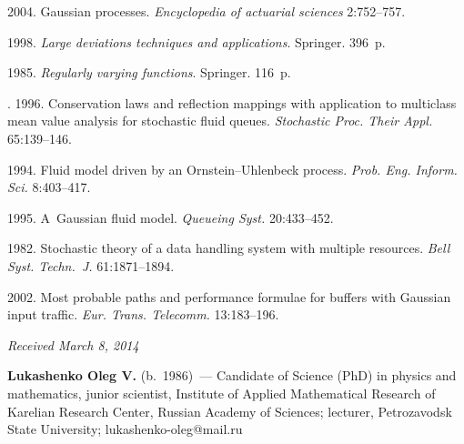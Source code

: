 \begin{multicols}{2}
{{\begin{thebibliography}{99}
 2004. Gaussian processes. \textit{Encyclopedia of actuarial
sciences} 2:752--757.

 1998.
\textit{Large deviations techniques and applications}. Springer. 396~p.

 1985. \textit{Regularly varying functions}. Springer. 116~p.

. 1996.
Conservation
laws and reflection mappings with application to multiclass mean
value analysis for stochastic fluid queues. \textit{Stochastic
Proc. Their Appl.} 65:139--146.

 1994.
Fluid model driven by an Ornstein--Uhlenbeck process.
\textit{Prob. Eng. Inform. Sci.} 8:403--417.

  1995.
A~Gaussian fluid model. \textit{Queueing Syst.} 20:433--452.

  1982.
Stochastic theory of a data handling system with multiple resources.
\textit{Bell Syst. Techn.~J.} 61:1871--1894.

 2002. Most probable paths and performance
formulae for buffers with Gaussian input traffic.
\textit{Eur. Trans. Telecomm.} 13:183--196.



\end{thebibliography} } }

\end{multicols}

\vspace*{-6pt}

\hfill{\small\textit{Received March 8, 2014}}

\vspace*{-6pt}

\Contr

\noindent
\textbf{Lukashenko Oleg V.} (b.\ 1986)~---
Candidate of Science (PhD) in physics and mathematics,
junior scientist, Institute of Applied Mathematical Research of Karelian
Research Center, Russian Academy of Sciences; lecturer,
Petrozavodsk State University; lukashenko-oleg@mail.ru

\vspace*{3pt}

